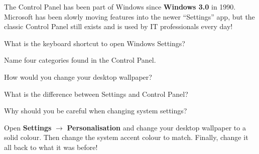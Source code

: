 
\begin{funfact}
The Control Panel has been part of Windows since \textbf{Windows 3.0} in 1990. Microsoft has been slowly moving features into the newer ``Settings'' app, but the classic Control Panel still exists and is used by IT professionals every day!
\end{funfact}

\begin{reviewqs}
  \item What is the keyboard shortcut to open Windows Settings?
  \item Name four categories found in the Control Panel.
  \item How would you change your desktop wallpaper?
  \item What is the difference between Settings and Control Panel?
  \item Why should you be careful when changing system settings?
\end{reviewqs}

\begin{challenge}
Open \textbf{Settings} $\rightarrow$ \textbf{Personalisation} and change your desktop wallpaper to a solid colour. Then change the system accent colour to match. Finally, change it all back to what it was before!
\end{challenge}
